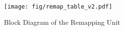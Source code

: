 \begin{figure}[t]
  \centering
  \texttt{[image: fig/remap\_table\_v2.pdf]}
  \vspace{-0.5cm}
  \caption{Block Diagram of the Remapping Unit}
  \vspace{-0.6cm}
  \label{fig:remap_table}
\end{figure}